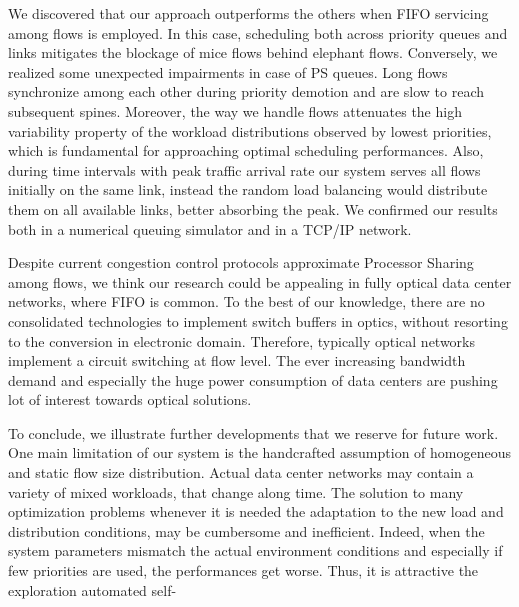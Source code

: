 We discovered that our approach outperforms the others when FIFO servicing among flows is employed. In this case, scheduling both across priority queues and links mitigates the blockage of mice flows behind elephant flows. Conversely, we realized some unexpected impairments in case of PS queues. Long flows synchronize among each other during priority demotion and are slow to reach subsequent spines. Moreover,   
the way we handle flows attenuates the high variability property of the workload distributions observed by lowest priorities, which is fundamental for approaching optimal scheduling performances. 
Also, during time intervals with peak traffic arrival rate our system serves all flows initially on the same link, instead the random load balancing would distribute them on all available links, better absorbing the peak. We confirmed our results both in a numerical queuing simulator and in a TCP/IP network. 

Despite current congestion control protocols approximate Processor Sharing among flows, we think our research could be appealing in fully optical data center networks, where FIFO is common. To the best of our knowledge, there are no consolidated technologies to implement switch buffers in optics, without resorting to the conversion in electronic domain. Therefore, typically optical networks implement a circuit switching at flow level. The ever increasing bandwidth demand and especially the huge power consumption of data centers are pushing lot of interest towards optical solutions. 

To conclude, we illustrate further developments that we reserve for future work. One main limitation of our system is the handcrafted assumption of homogeneous and static flow size distribution. Actual data center networks may contain a variety of mixed workloads, that change along time. The solution to many optimization problems whenever it is needed the adaptation to the new load and distribution conditions, may be cumbersome and inefficient. Indeed, when the system parameters mismatch the actual environment conditions and especially if few priorities are used, the performances get worse. Thus, it is attractive the exploration automated self- 
